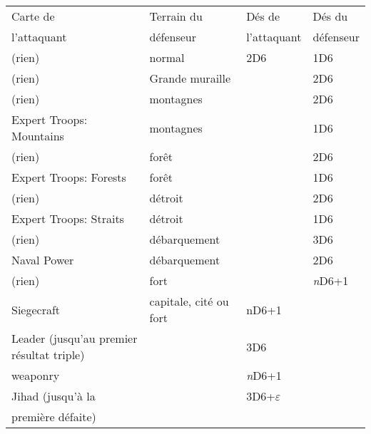 \documentclass[a4paper,twocolumn]{article}
\newenvironment{texte}{\rmfamily\footnotesize}{}
\newcommand{\eps}[0]{$\varepsilon$}
\begin{document}
\begin{texte}
\begin{tabular}[t]{|p{30mm}|p{16mm}|p{10mm}|p{10mm}|}
\hline
       Carte de         & Terrain du          &  Dés de              & Dés du  \\
       l'attaquant      & défenseur           &  l'attaquant         & défenseur  \\
\hline
      (rien)            & normal              &         2D6          &       1D6         \\
\hline
      (rien)            & Grande muraille     &                      &       2D6         \\
\hline
      (rien)            & montagnes           &                      &       2D6         \\
\hline
Expert Troops: Mountains& montagnes           &                      &       1D6         \\
\hline
      (rien)            & forêt               &                      &       2D6         \\
\hline
 Expert Troops: Forests & forêt               &                      &       1D6         \\
\hline
      (rien)            & détroit             &                      &       2D6         \\
\hline
 Expert Troops: Straits & détroit             &                      &       1D6         \\
\hline
      (rien)            & débarquement        &                      &       3D6         \\
\hline
Naval Power             & débarquement        &                      &       2D6         \\
\hline
      (rien)            & fort                &                      & \textit{n}D6+1    \\
\hline
    Siegecraft          & capitale, cité ou
                                fort          &        nD6+1         &                   \\
\hline
Leader (jusqu'au premier
résultat triple)        &                     &         3D6          &                   \\
\hline
     weaponry           &                     & \textit{n}D6+1       &                   \\
\hline
 Jihad (jusqu'à la      &                     &       3D6+\eps       &                   \\
 première défaite)      &                     &                      &                   \\

\end{tabular}
\end{texte}
\end{document}
